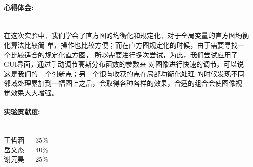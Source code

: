 \documentclass{ctexart}
\begin{document}
\paragraph{\textbf{心得体会:}}~\\
在这次实验中，我们学会了直方图的均衡化和规定化，对于全局变量的直方图均衡化算法比较简
单，操作也比较方便；而在直方图规定化的时候，由于需要寻找一个比较适合的规定化直方图，
所以需要进行多次尝试，为此，我们尝试应用了GUI界面，通过手动调节高斯分布函数的参数来
对图像进行快速的调节，可以说这是我们的一个创新点；另一个很有收获的点在局部均衡化处理
的时候发现不同邻域处理累加到一幅图上之后，会取得各种各样的效果，合适的组合会使图像视
觉效果大大增强。

\paragraph{\textbf{实验贡献度:}}~\\
王哲涵 ~~ 35\%\\
岳文杰 ~~ 40\%\\
谢元昊 ~~ 25\%
\end{document}
